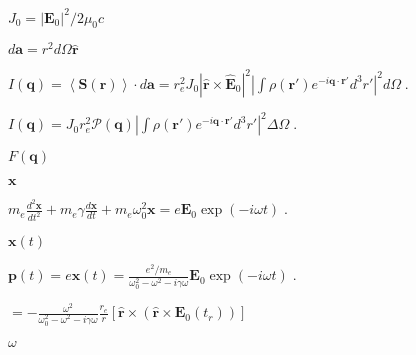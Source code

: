 \documentclass[12pt]{article}
\renewcommand{\vec}[1]{\boldsymbol{#1}}%
\def\lthtmlcheckvsize{\ifdim\ht\sizebox<\vsize 
  \ifdim\wd\sizebox<\hsize\expandafter\hfill\fi \expandafter\vfill
  \else\expandafter\vss\fi}%
\begin{document}
{\newpage\clearpage
{}%
$ J_0 = |\vec{E}_0|^2/2\mu_0c$%
\lthtmlindisplaymathZ
\lthtmlcheckvsize\clearpage}

{\newpage\clearpage
{}%
$ d\vec{a} = r^2 d\Omega \hat{\vec{r}}$%
\lthtmlindisplaymathZ
\lthtmlcheckvsize\clearpage}

{\newpage\clearpage
{}%
$\displaystyle I(\vec{q}) = \left\langle \vec{S}(\vec{r}) \right\rangle  \cdot d\vec{a} = r_e^2 J_0 | \hat{\vec{r}} \times
\hat{\vec{E}}_0 |^2 \left| \int \rho(\vec{r}') e^{-i\vec{q}\cdot\vec{r}'} d^3r'
\right|^2 d\Omega\;.$%
\lthtmlindisplaymathZ
\lthtmlcheckvsize\clearpage}

{\newpage\clearpage
{}%
$\displaystyle I(\vec{q}) = J_0 r_e^2  \mathcal{P}(\vec{q})
\left| \int \rho(\vec{r}') e^{-i\vec{q}\cdot\vec{r}'} d^3r' \right|^2 \Delta \Omega \;.$%
\lthtmlindisplaymathZ
\lthtmlcheckvsize\clearpage}

{\newpage\clearpage
{}%
$ F(\vec{q})$%
\lthtmlindisplaymathZ
\lthtmlcheckvsize\clearpage}

{\newpage\clearpage
{}%
$ \vec{x}$%
\lthtmlindisplaymathZ
\lthtmlcheckvsize\clearpage}

{\newpage\clearpage
{}%
$\displaystyle m_e \frac{d^2\vec{x}}{dt^2} + m_e \gamma \frac{d\vec{x}}{dt} + m_e\omega_0^2
\vec{x} = e \vec{E}_0 \exp(-i\omega t) \;.$%
\lthtmlindisplaymathZ
\lthtmlcheckvsize\clearpage}

{\newpage\clearpage
{}%
$ \vec{x}(t)$%
\lthtmlindisplaymathZ
\lthtmlcheckvsize\clearpage}

{\newpage\clearpage
{}%
$\displaystyle \vec{p}(t) = e \vec{x}(t) = \frac{e^2/m_e}{\omega_0^2 - \omega^2 - i \gamma
\omega}\vec{E}_0 \exp(-i\omega t) \;.$%
\lthtmlindisplaymathZ
\lthtmlcheckvsize\clearpage}

{\newpage\clearpage
{}%
$\displaystyle =  -\frac{\omega^2}{\omega_0^2 - \omega^2 - i \gamma
\omega}\frac{r_e}{r} [\hat{\vec{r}} \times ( \hat{\vec{r}} \times
\vec{E}_0(t_r))] \;$%
\lthtmlindisplaymathZ
\lthtmlcheckvsize\clearpage}

{\newpage\clearpage
{}%
$ \omega$%
\lthtmlindisplaymathZ
\lthtmlcheckvsize\clearpage}
\end{document}
